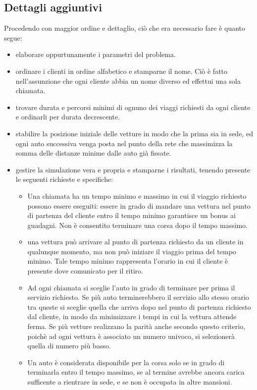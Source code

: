 \documentclass[a4paper,11pt]{Article}
\begin{document}
\subsection{Dettagli aggiuntivi}
Procedendo con maggior ordine e dettaglio, ciò che era necessario fare è quanto segue:
\begin{itemize}
\item elaborare oppurtunamente i parametri del problema.
\item ordinare i clienti in ordine alfabetico e stamparne il nome. Ciò è fatto nell'assunzione che ogni cliente abbia un nome diverso ed effettui una sola chiamata.
\item trovare durata e percorsi minimi di ognuno dei viaggi richiesti da ogni cliente e ordinarli per durata decrescente.
\item stabilire la posizione iniziale delle vetture in modo che la prima sia in sede, ed ogni auto successiva venga posta nel punto della rete che massimizza la somma delle distanze minime dalle auto già fissate.
\item gestire la simulazione vera e propria e stamparne i risultati, tenendo presente le seguenti richieste e specifiche:
  \begin{itemize}[label=$\ast$]
    \item Una chiamata ha un tempo minimo e massimo in cui il viaggio richiesto possono essere eseguiti: essere in grado di mandare una vettura nel punto di partenza del cliente entro il tempo minimo garantisce un bonus ai guadagni. Non è consentito terminare una corsa dopo il tempo massimo.
    \item una vettura può arrivare al punto di partenza richiesto da un cliente in qualunque momento, ma non può iniziare il viaggio prima del tempo minimo. Tale tempo minimo rappresenta l'orario in cui il cliente è presente dove comunicato per il ritiro.
    \item Ad ogni chiamata si sceglie l'auto in grado di terminare per prima il servizio richiesto. Se più auto terminerebbero il servizio allo stesso orario tra queste si sceglie quella che arriva dopo nel punto di partenza richiesto dal cliente, in modo da minimizzare i tempi in cui la vettura attende ferma. Se più vetture realizzano la parità anche secondo questo criterio, poichè ad ogni vettura è associato un numero univoco, si selezionerà quella di numero più basso.
    \item Un auto è considerata disponibile per la corsa solo se in grado di terminarla entro il tempo massimo, se al termine avrebbe ancora carica sufficente a rientrare in sede, e se non è occupata in altre mansioni.

\end{itemize}
\end{itemize}
\end{document}
